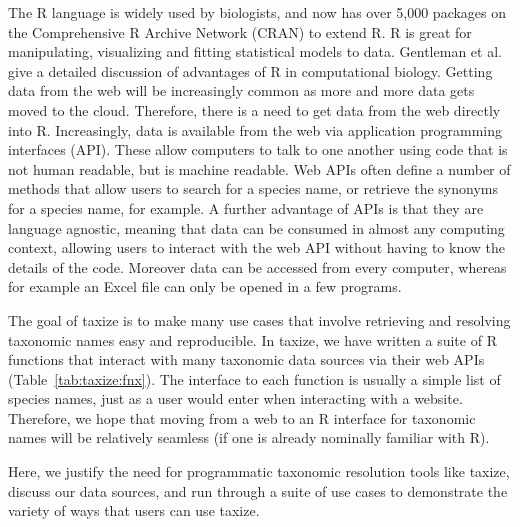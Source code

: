 \begin{sloppypar}
The R language is widely used by biologists, and now has over 5,000 packages on the Comprehensive R Archive Network (CRAN) to extend R. 
R is great for manipulating, visualizing and fitting statistical models to data. 
Gentleman et al. \citet{gentleman_bioconductor:_2004} give a detailed discussion of advantages of R in computational biology. Getting data from the web will be increasingly common as more and more data gets moved to the cloud. 
Therefore, there is a need to get data from the web directly into R. 
Increasingly, data is available from the web via application programming interfaces (API). 
These allow computers to talk to one another using code that is not human readable, but is machine readable. 
Web APIs often define a number of methods that allow users to search for a species name, or retrieve the synonyms for a species name, for example. 
A further advantage of APIs is that they are language agnostic, meaning that data can be consumed in almost any computing context, allowing users to interact with the web API without having to know the details of the code. 
Moreover data can be accessed from every computer, whereas for example an Excel file can only be opened in a few programs. 

The goal of taxize is to make many use cases that involve retrieving and resolving taxonomic names easy and reproducible. 
In taxize, we have written a suite of R functions that interact with many taxonomic data sources via their web APIs (Table~\ref{tab:taxize:fnx}). 
The interface to each function is usually a simple list of species names, just as a user would enter when interacting with a website. 
Therefore, we hope that moving from a web to an R interface for taxonomic names will be relatively seamless (if one is already nominally familiar with R). 

Here, we justify the need for programmatic taxonomic resolution tools like taxize, discuss our data sources, and run through a suite of use cases to demonstrate the variety of ways that users can use taxize.


\end{sloppypar}
